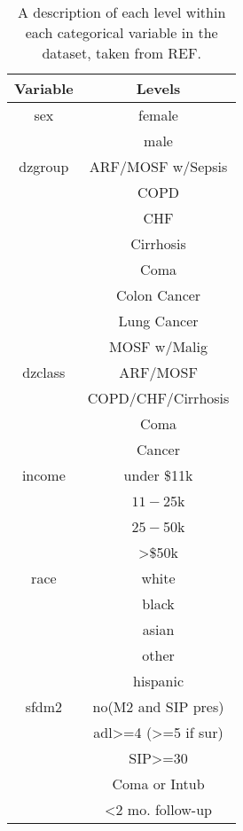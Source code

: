 \documentclass[
]{jss}
\begin{document}
\begin{table}[]
\centering
\begin{tabular}{cc}
\hline
\textbf{Variable} & \textbf{Levels}                      \\
\hline
sex      & female                                        \\
         & male                                          \\
dzgroup  & ARF/MOSF w/Sepsis                             \\
         & COPD                                          \\
         & CHF                                           \\
         & Cirrhosis                                     \\
         & Coma                                          \\
         & Colon Cancer                                  \\
         & Lung Cancer                                   \\
         & MOSF w/Malig                                  \\
dzclass  & ARF/MOSF                                      \\
         & COPD/CHF/Cirrhosis                            \\
         & Coma                                          \\
         & Cancer                                        \\
income   & under \$11k                                   \\
         & $11-$25k                                      \\
         & $25-$50k                                      \\
         & \textgreater{}\$50k                           \\
race     & white                                         \\
         & black                                         \\
         & asian                                         \\
         & other                                         \\
         & hispanic                                      \\
sfdm2    & no(M2 and SIP pres)                           \\
         & adl\textgreater{}=4 (\textgreater{}=5 if sur) \\
         & SIP\textgreater{}=30                          \\
         & Coma or Intub                                 \\
         & \textless{}2 mo. follow-up                   
\end{tabular}
\caption{A description of each level within each categorical variable in the dataset, taken from REF.}
\label{tab:my-table}
\end{table}
\end{document}
